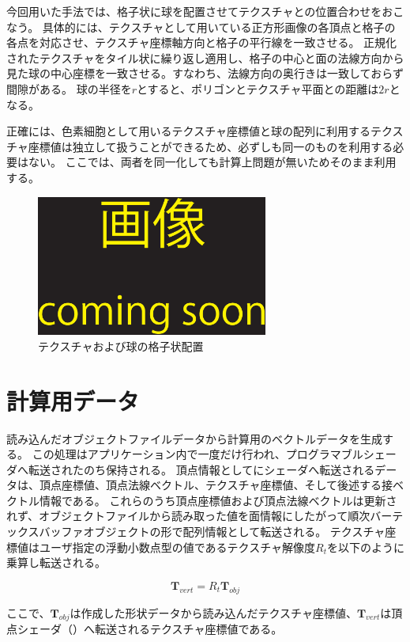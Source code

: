 \noindent
今回用いた手法では、格子状に球を配置させてテクスチャとの位置合わせをおこなう。
具体的には、テクスチャとして用いている正方形画像の各頂点と格子の各点を対応させ、テクスチャ座標軸方向と格子の平行線を一致させる。
正規化されたテクスチャをタイル状に繰り返し適用し、格子の中心と面の法線方向から見た球の中心座標を一致させる。すなわち、法線方向の奥行きは一致しておらず間隙がある。
球の半径を$r$とすると、ポリゴンとテクスチャ平面との距離は$2r$となる\figref{}。

正確には、色素細胞として用いるテクスチャ座標値と球の配列に利用するテクスチャ座標値は独立して扱うことができるため、必ずしも同一のものを利用する必要はない。
ここでは、両者を同一化しても計算上問題が無いためそのまま利用する。

\begin{figure}[h]
  \centering
  \includegraphics[width=3.0in]{./img/TEMP}
  \caption{テクスチャおよび球の格子状配置}
  \label{FGrid}
\end{figure}

\section{計算用データ}
\label{SCalcData}

読み込んだオブジェクトファイルデータから計算用のベクトルデータを生成する。
この処理はアプリケーション内で一度だけ行われ、プログラマブルシェーダへ転送されたのち保持される。
頂点情報としてにシェーダへ転送されるデータは、頂点座標値、頂点法線ベクトル、テクスチャ座標値、そして後述する接ベクトル情報である。
これらのうち頂点座標値および頂点法線ベクトルは更新されず、オブジェクトファイルから読み取った値を面情報にしたがって順次バーテックスバッファオブジェクトの形で配列情報として転送される。
テクスチャ座標値はユーザ指定の浮動小数点型の値であるテクスチャ解像度$R_t$を以下のように乗算し転送される。

\begin{equation}
{\bm T_{vert}} = R_{t}{\bm T_{obj}}
\end{equation}

\noindent
ここで、$\bm{T}_{obj}$は作成した形状データから読み込んだテクスチャ座標値、$\bm{T}_{vert}$は頂点シェーダ（）へ転送されるテクスチャ座標値である。

